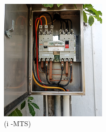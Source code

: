 \begin{figure}[!h]
\begin{minipage}[b]{0.22\linewidth}
	\includegraphics[width=\textwidth]{figures/fig_ch04_elecaudit_visualinspection_mts}
	\caption*{(i -MTS)}
\end{minipage}
	\hspace{0.03cm}
\begin{minipage}[b]{0.22\linewidth}

\end{minipage}
\end{figure}
